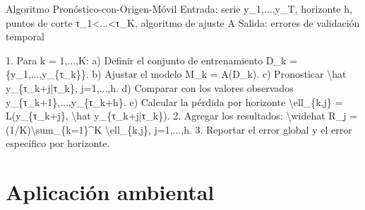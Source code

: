 \documentclass[
  spanish,
  10.5pt,
  letterpaper,
  DIV=11,
  numbers=noendperiod,
  oneside,
  open=any]{scrreprt}
\newenvironment{Shaded}{\begin{snugshade}}{\end{snugshade}}
\newcommand{\NormalTok}[1]{\textcolor[rgb]{0.00,0.23,0.31}{#1}}
\theoremstyle{definition}
\theoremstyle{definition}
\theoremstyle{plain}
\theoremstyle{remark}
\begin{document}
\begin{tcolorbox}[enhanced jigsaw, arc=.35mm, bottomrule=.15mm, bottomtitle=1mm, breakable, colback=white, colbacktitle=quarto-callout-note-color!10!white, colframe=quarto-callout-note-color-frame, coltitle=black, left=2mm, leftrule=.75mm, opacityback=0, opacitybacktitle=0.6, rightrule=.15mm, title=\textcolor{quarto-callout-note-color}{\faInfo}\hspace{0.5em}{Seudocódigo matemático formal}, titlerule=0mm, toprule=.15mm, toptitle=1mm]

\begin{Shaded}
\begin{Highlighting}[numbers=left,,]
\NormalTok{Algoritmo Pronóstico{-}con{-}Origen{-}Móvil}
\NormalTok{Entrada:}
\NormalTok{  serie y\_1,...,y\_T, horizonte h,}
\NormalTok{  puntos de corte τ\_1\textless{}...\textless{}τ\_K,}
\NormalTok{  algoritmo de ajuste A}
\NormalTok{Salida:}
\NormalTok{  errores de validación temporal}

\NormalTok{1. Para k = 1,...,K:}
\NormalTok{   a) Definir el conjunto de entrenamiento}
\NormalTok{         D\_k = \{y\_1,...,y\_\{τ\_k\}\}.}
\NormalTok{   b) Ajustar el modelo}
\NormalTok{         M\_k = A(D\_k).}
\NormalTok{   c) Pronosticar}
\NormalTok{         \textbackslash{}hat y\_\{τ\_k+j|τ\_k\},}
\NormalTok{         j=1,...,h.}
\NormalTok{   d) Comparar con los valores observados}
\NormalTok{         y\_\{τ\_k+1\},...,y\_\{τ\_k+h\}.}
\NormalTok{   e) Calcular la pérdida por horizonte}
\NormalTok{         \textbackslash{}ell\_\{k,j\}}
\NormalTok{         = L(y\_\{τ\_k+j\},}
\NormalTok{             \textbackslash{}hat y\_\{τ\_k+j|τ\_k\}).}
\NormalTok{2. Agregar los resultados:}
\NormalTok{      \textbackslash{}widehat R\_j}
\NormalTok{      = (1/K)\textbackslash{}sum\_\{k=1\}\^{}K \textbackslash{}ell\_\{k,j\},}
\NormalTok{      j=1,...,h.}
\NormalTok{3. Reportar el error global y el error específico por horizonte.}
\end{Highlighting}
\end{Shaded}

\end{tcolorbox}

\section*{Aplicación ambiental}\label{aplicaciuxf3n-ambiental-1}

\end{document}
